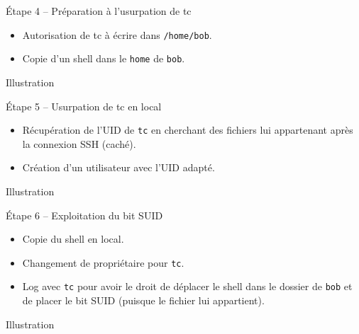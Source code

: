 \documentclass{beamer}
\begin{document}
\begin{frame}[fragile]
\begin{block}{Étape 4 -- Préparation à l'usurpation de tc}
\begin{itemize}
\item Autorisation de tc à écrire dans \verb+/home/bob+.
\item Copie d'un shell dans le \verb+home+ de \verb+bob+.
\end{itemize}
\end{block}
\begin{exampleblock}{Illustration}
\begin{center}
\end{center}
\end{exampleblock}
\end{frame}

\begin{frame}[fragile]
\begin{block}{Étape 5 -- Usurpation de tc en local}
\begin{itemize}
\item Récupération de l'UID de \verb+tc+ en cherchant des
fichiers lui appartenant après la connexion SSH (caché).
\item Création d'un utilisateur avec l'UID adapté.
\end{itemize}
\end{block}
\begin{exampleblock}{Illustration}
\begin{center}
\end{center}
\end{exampleblock}
\end{frame}

\begin{frame}[fragile]
\begin{block}{Étape 6 -- Exploitation du bit SUID}
\begin{itemize}
\item Copie du shell en local.
\item Changement de propriétaire pour \verb+tc+.
\item Log avec \verb+tc+ pour avoir le droit de déplacer le shell
dans le dossier de \verb+bob+ et de placer le bit SUID
(puisque le fichier lui appartient).
\end{itemize}
\end{block}
\begin{exampleblock}{Illustration}
\begin{center}
\end{center}
\end{exampleblock}
\end{frame}
\end{document}
